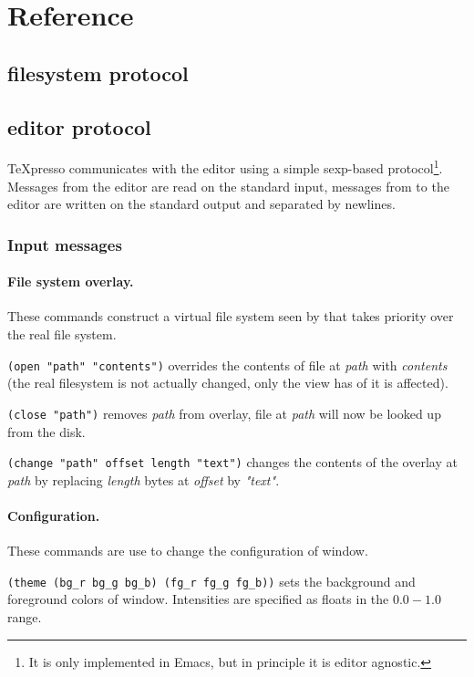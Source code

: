 \documentclass{article}
\begin{document}
\section{Reference}

\subsection{\txp filesystem protocol}

\subsection{\txp editor protocol}

TeXpresso communicates with the editor using a simple sexp-based protocol\footnote{It is only implemented in Emacs, but in principle it is editor agnostic.}.
Messages from the editor are read on the standard input, messages from \txp to the editor are written on the standard output and separated by newlines.

\subsubsection{Input messages}

\paragraph{File system overlay.} These commands construct a virtual file system seen by \txp that takes priority over the real file system.

\texttt{(open "path" "contents")} overrides the contents of file at {\em path}
with {\em contents} (the real filesystem is not actually changed, only the view \txp has of it is affected).

\texttt{(close "path")} removes {\em path} from \txp overlay, file at {\em path} will now be looked up from the disk.

\texttt{(change "path" offset length "text")} changes the contents of the overlay at {\em path} by replacing {\em length} bytes at {\em offset} by {\em "text"}.

\paragraph{Configuration.} These commands are use to change the configuration of \txp window.

\texttt{(theme (bg\_r bg\_g bg\_b) (fg\_r fg\_g fg\_b))} sets the background and foreground colors of \txp window. Intensities are specified as floats in the $0.0-1.0$ range.
\end{document}
